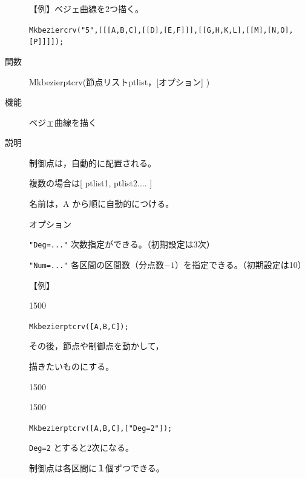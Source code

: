 \documentclass[papersize,a4paper,12pt,uplatex]{jsarticle}
\begin{document}
\begin{description}
\vspace{\baselineskip}
【例】ベジェ曲線を2つ描く。

\verb|Mkbeziercrv("5",[[[A,B,C],[[D],[E,F]]],[[G,H,K,L],[[M],[N,O],[P]]]]);|

 \scalebox{0.95}{}

\vspace{\baselineskip}
\hypertarget{mkbezierptcrv}{}
\item[関数]Mkbezierptcrv(節点リストptlist，[オプション] )
\item[機能]ベジェ曲線を描く
\item[説明]制御点は，自動的に配置される。

複数の場合は[ ptlist1, ptlist2.... ]

名前は，A から順に自動的につける。

オプション

\verb|"Deg=..."| 次数指定ができる。（初期設定は3次）

\verb|"Num=..."| 各区間の区間数（分点数$-1$）を指定できる。（初期設定は10）

\vspace{\baselineskip}

【例】

\begin{layer}{150}{0}
\end{layer}

\verb|Mkbezierptcrv([A,B,C]);|

\vspace{23mm}

その後，節点や制御点を動かして，\par
描きたいものにする。

\begin{layer}{150}{0}
\end{layer}

\vspace{35mm}

\begin{layer}{150}{0}
\end{layer}

\verb|Mkbezierptcrv([A,B,C],["Deg=2"]);|

\verb|Deg=2| とすると2次になる。

制御点は各区間に１個ずつできる。

\vspace{20mm}


\end{description}
\end{document}
